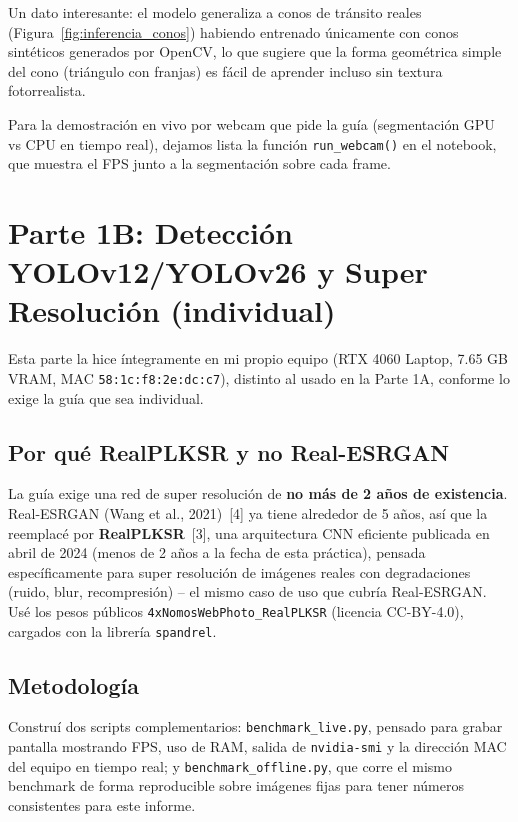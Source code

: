 \documentclass[12pt,a4paper]{article}
\let\oldsubsection\subsection
\renewcommand{\subsection}[1]{\needspace{5\baselineskip}\oldsubsection{#1}}
\begin{document}
Un dato interesante: el modelo generaliza a conos de tránsito reales (Figura~\ref{fig:inferencia_conos}) habiendo entrenado únicamente con conos sintéticos generados por OpenCV, lo que sugiere que la forma geométrica simple del cono (triángulo con franjas) es fácil de aprender incluso sin textura fotorrealista.

Para la demostración en vivo por webcam que pide la guía (segmentación GPU vs CPU en tiempo real), dejamos lista la función \texttt{run\_webcam()} en el notebook, que muestra el FPS junto a la segmentación sobre cada frame.

\section{Parte 1B: Detección YOLOv12/YOLOv26 y Super Resolución (individual)}

Esta parte la hice íntegramente en mi propio equipo (RTX 4060 Laptop, 7.65 GB VRAM, MAC \texttt{58:1c:f8:2e:dc:c7}), distinto al usado en la Parte 1A, conforme lo exige la guía que sea individual.

\subsection{Por qué RealPLKSR y no Real-ESRGAN}

La guía exige una red de super resolución de \textbf{no más de 2 años de existencia}. Real-ESRGAN (Wang et al., 2021)~[4] ya tiene alrededor de 5 años, así que la reemplacé por \textbf{RealPLKSR}~[3], una arquitectura CNN eficiente publicada en abril de 2024 (menos de 2 años a la fecha de esta práctica), pensada específicamente para super resolución de imágenes reales con degradaciones (ruido, blur, recompresión) -- el mismo caso de uso que cubría Real-ESRGAN. Usé los pesos públicos \texttt{4xNomosWebPhoto\_RealPLKSR} (licencia CC-BY-4.0), cargados con la librería \texttt{spandrel}.

\subsection{Metodología}

Construí dos scripts complementarios: \texttt{benchmark\_live.py}, pensado para grabar pantalla mostrando FPS, uso de RAM, salida de \texttt{nvidia-smi} y la dirección MAC del equipo en tiempo real; y \texttt{benchmark\_offline.py}, que corre el mismo benchmark de forma reproducible sobre imágenes fijas para tener números consistentes para este informe.
\end{document}

